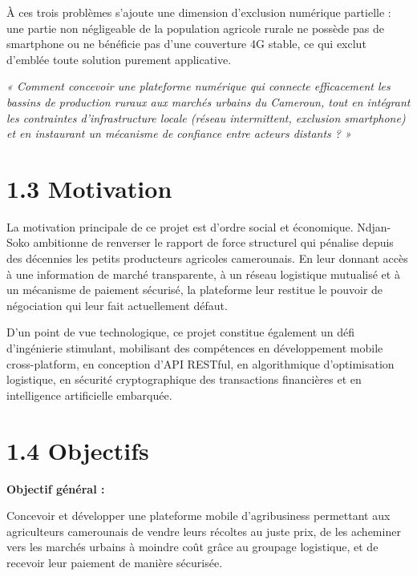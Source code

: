 \documentclass[12pt,a4paper]{report}
\begin{document}
À ces trois problèmes s'ajoute une dimension d'exclusion numérique partielle : une partie non négligeable de la population agricole rurale ne possède pas de smartphone ou ne bénéficie pas d'une couverture 4G stable, ce qui exclut d'emblée toute solution purement applicative.

\begin{infobox}
\textit{« Comment concevoir une plateforme numérique qui connecte efficacement les bassins de production ruraux aux marchés urbains du Cameroun, tout en intégrant les contraintes d'infrastructure locale (réseau intermittent, exclusion smartphone) et en instaurant un mécanisme de confiance entre acteurs distants ? »}
\end{infobox}

\section*{1.3 Motivation}

La motivation principale de ce projet est d'ordre social et économique. Ndjan-Soko ambitionne de renverser le rapport de force structurel qui pénalise depuis des décennies les petits producteurs agricoles camerounais. En leur donnant accès à une information de marché transparente, à un réseau logistique mutualisé et à un mécanisme de paiement sécurisé, la plateforme leur restitue le pouvoir de négociation qui leur fait actuellement défaut.

D'un point de vue technologique, ce projet constitue également un défi d'ingénierie stimulant, mobilisant des compétences en développement mobile cross-platform, en conception d'API RESTful, en algorithmique d'optimisation logistique, en sécurité cryptographique des transactions financières et en intelligence artificielle embarquée.

\section*{1.4 Objectifs}

\textbf{Objectif général :}

Concevoir et développer une plateforme mobile d'agribusiness permettant aux agriculteurs camerounais de vendre leurs récoltes au juste prix, de les acheminer vers les marchés urbains à moindre coût grâce au groupage logistique, et de recevoir leur paiement de manière sécurisée.
\end{document}
